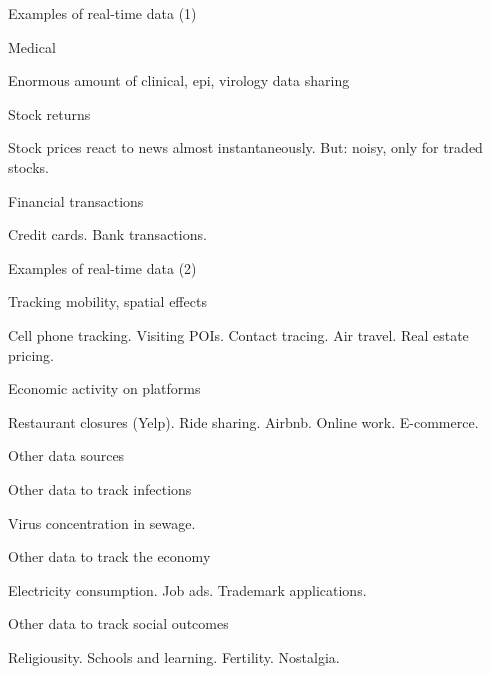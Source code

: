 \documentclass[ignorenonframetext,aspectratio=54,]{beamer}
\begin{document}
\begin{frame}{Examples of real-time data (1)}
\protect\hypertarget{examples-of-real-time-data-1}{}

\begin{block}{Medical}

Enormous amount of clinical, epi, virology data sharing

\end{block}

\begin{block}{Stock returns}

Stock prices react to news almost instantaneously. But: noisy, only for
traded stocks.

\end{block}

\begin{block}{Financial transactions}

Credit cards. Bank transactions.

\end{block}

\end{frame}

\begin{frame}{Examples of real-time data (2)}
\protect\hypertarget{examples-of-real-time-data-2}{}

\begin{block}{Tracking mobility, spatial effects}

Cell phone tracking. Visiting POIs. Contact tracing. Air travel. Real
estate pricing.

\end{block}

\begin{block}{Economic activity on platforms}

Restaurant closures (Yelp). Ride sharing. Airbnb. Online work.
E-commerce.

\end{block}

\end{frame}

\begin{frame}{Other data sources}
\protect\hypertarget{other-data-sources}{}

\begin{block}{Other data to track infections}

Virus concentration in sewage.

\end{block}

\begin{block}{Other data to track the economy}

Electricity consumption. Job ads. Trademark applications.

\end{block}

\begin{block}{Other data to track social outcomes}

Religiousity. Schools and learning. Fertility. Nostalgia.

\end{block}

\end{frame}
\end{document}
